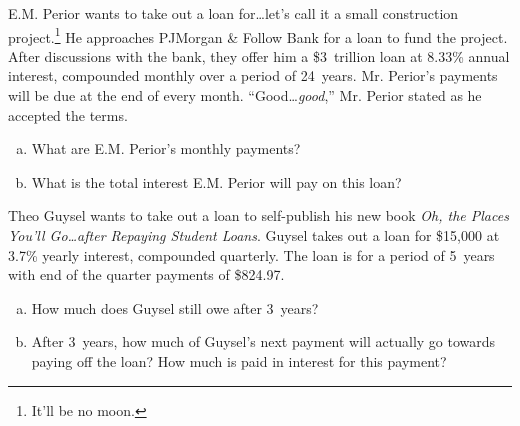 \documentclass[11pt,letterpaper]{article}
\begin{document}

 E.M. Perior wants to take out a loan for\dots let's call it a small construction project.\footnote{It'll be no moon.} He approaches PJMorgan \& Follow Bank for a loan to fund the project. After discussions with the bank, they offer him a \$3~trillion loan at 8.33\% annual interest, compounded monthly over a period of 24~years. Mr. Perior's payments will be due at the end of every month. ``Good\dots \textit{good},'' Mr. Perior stated as he accepted the terms. 
	\begin{enumerate}[(a)]
	\item What are E.M. Perior's monthly payments?
	\item What is the total interest E.M. Perior will pay on this loan?
	\end{enumerate}



\newpage



 Theo Guysel wants to take out a loan to self-publish his new book \textit{Oh, the Places You'll Go\dots after Repaying Student Loans}. Guysel takes out a loan for \$15,000 at 3.7\% yearly interest, compounded quarterly. The loan is for a period of 5~years with end of the quarter payments of \$824.97.
	\begin{enumerate}[(a)]
	\item How much does Guysel still owe after 3~years?
	\item After 3~years, how much of Guysel's next payment will actually go towards paying off the loan? How much is paid in interest for this payment?
	\end{enumerate}
\end{document}
